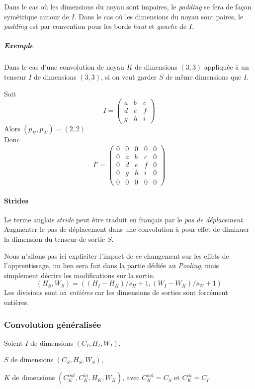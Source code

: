 \documentclass[a4paper, 10pt]{report}
\begin{document}
Dans le cas où les dimensions du noyau sont impaires, le \emph{padding} se fera de façon symétrique autour de $I$.
Dans le cas où les dimensions du noyau sont paires, le \emph{padding} est par convention pour les bords \emph{haut} et \emph{gauche} de $I$.

\subparagraph{Exemple}
Dans le cas d'une convolution de noyau $K$ de dimensions $(3, 3)$ appliquée à un tenseur $I$ de dimensions $(3,3)$, si on veut garder $S$ de même dimensions que $I$.

Soit
$$I =
\begin{pmatrix}
a & b & c \\ 
d & e & f \\ 
g & h & i
\end{pmatrix}$$
Alors $(p_H,p_W) = (2, 2)$\\
Donc $$I'=
\begin{pmatrix}
0 & 0 & 0 & 0 & 0\\
0 & a & b & c & 0\\ 
0 & d & e & f & 0\\ 
0 & g & h & i & 0\\
0 & 0 & 0 & 0 & 0
\end{pmatrix}
$$
\paragraph{Strides}
Le terme anglais \emph{stride} peut être traduit en français par le \emph{pas de déplacement}.\\
Augmenter le pas de déplacement dans une convolution à pour effet de diminuer la dimension du tenseur de sortie $S$.

Nous n'allons pas ici expliciter l'impact de ce changement sur les effets de l'apprentissage, un lien sera fait dans la partie dédiée au \emph{Pooling}, mais simplement décrire les modifications sur la sortie.
$$(H_S, W_S) = ((H_I - H_K) / s_H + 1, (W_I - W_K) / s_W + 1)$$
Les divisions sont ici \emph{entières} car les dimensions de sorties sont forcément entières.
\subsubsection{Convolution généralisée}
Soient $I$ de dimensions $(C_I, H_I,W_I)$,

$S$ de dimensions $(C_S, H_S, W_S)$,

$K$ de dimensions $(C_K^{out}, C_K^{in}, H_K, W_K)$, avec $C_K^{out} = C_S$ et $C_K^{in} = C_I$.
\end{document}

